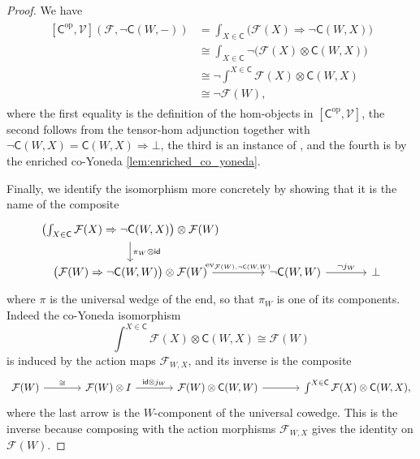 \documentclass[11pt,onecolumn]{article}
\newcommand{\id}{\mathsf{id}}
\newcommand{\ev}{\mathrm{ev}}
\newcommand{\cV}{\mathscr{V}}
\newcommand{\cC}{\mathsf{C}}
\newcommand{\op}{\mathrm{op}}
\theoremstyle{plain}
\theoremstyle{remark}
\theoremstyle{definition}
\begin{document}
\begin{proof}
	We have
	\begin{align}
		\label{eq:dual_yoneda_proof}
		\begin{split}
			[\cC^\op,\cV](\mathcal{F}, \neg \cC(W,-))
			& =
			\int_{X \in \cC} \bigl(\mathcal{F}(X) \Rightarrow \neg \cC(W,X)\bigr) \\
			& \cong
			\int_{X \in \cC} \neg\bigl(\mathcal{F}(X)\otimes \cC(W,X)\bigr) \\
			& \cong
			\neg \int^{X \in \cC} \mathcal{F}(X)\otimes \cC(W,X) \\
			& \cong
			\neg \mathcal{F}(W),
		\end{split}
	\end{align}
	where the first equality is the definition of the hom-objects in $[\cC^\op,\cV]$,
	the second follows from the tensor-hom adjunction together with $\neg \cC(W,X) = \cC(W,X) \Rightarrow \bot$,
	the third is an instance of ,
	and the fourth is by the enriched co-Yoneda \cref{lem:enriched_co_yoneda}.

	Finally, we identify the isomorphism more concretely by showing that it is the name of the composite
	\begin{equation}
		\label{dual_yoneda_explicit}
		\begin{tikzcd}[column sep=large]
			\left( \int_{X \in \cC} \mathcal{F}(X) \Rightarrow \neg \cC(W,X) \right) \otimes \mathcal{F}(W)
				\ar[d, "\pi_W\otimes\id"]
			\\
				\bigl(\mathcal{F}(W)\Rightarrow\neg\cC(W,W)\bigr)\otimes\mathcal{F}(W)
					\ar[r, "\ev_{\mathcal{F}(W),\neg\cC(W,W)}"]
			&
			\neg\cC(W,W)
				\ar[r, "\neg j_W"]
			&
			\bot
		\end{tikzcd}
	\end{equation}
	where $\pi$ is the universal wedge of the end, so that $\pi_W$ is one of its components.
	Indeed the co-Yoneda isomorphism
	\[
		\int^{X \in \cC}\mathcal{F}(X)\otimes \cC(W,X)
		\cong
		\mathcal{F}(W)
	\]
	is induced by the action maps $\mathcal{F}_{W,X}$, and its inverse is the composite
	\[
		\begin{tikzcd}[column sep=large]
			\mathcal{F}(W)
				\ar[r, "\cong"]
			&
			\mathcal{F}(W)\otimes I
				\ar[r, "\id\otimes j_W"]
			&
			\mathcal{F}(W)\otimes\cC(W,W)
				\ar[r]
			&
			\int^{X \in \cC} \mathcal{F}(X)\otimes \cC(W,X),
		\end{tikzcd}
	\]
	where the last arrow is the $W$-component of the universal cowedge.
	This is the inverse because composing with the action morphisms $\mathcal{F}_{W,X}$ gives the identity on $\mathcal{F}(W)$.
\end{proof}
\end{document}
